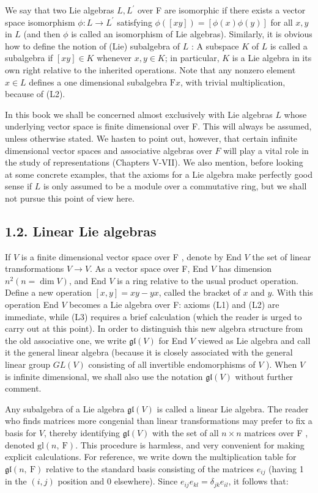 \documentclass[10pt]{article}
\begin{document}
We say that two Lie algebras $L, L^{\prime}$ over F are isomorphic if there exists a vector space isomorphism $\phi: L \rightarrow L^{\prime}$ satisfying $\phi([x y])=[\phi(x) \phi(y)]$ for all $x, y$ in $L$ (and then $\phi$ is called an isomorphism of Lie algebras). Similarly, it is obvious how to define the notion of (Lie) subalgebra of $L$ : A subspace $K$ of $L$ is called a subalgebra if $[x y] \in K$ whenever $x, y \in K$; in particular, $K$ is a Lie algebra in its own right relative to the inherited operations. Note that any nonzero element $x \in L$ defines a one dimensional subalgebra $\mathrm{F} x$, with trivial multiplication, because of (L2).

In this book we shall be concerned almost exclusively with Lie algebras $L$ whose underlying vector space is finite dimensional over F. This will always be assumed, unless otherwise stated. We hasten to point out, however, that certain infinite dimensional vector spaces and associative algebras over $F$ will play a vital role in the study of representations (Chapters V-VII). We also mention, before looking at some concrete examples, that the axioms for a Lie algebra make perfectly good sense if $L$ is only assumed to be a module over a commutative ring, but we shall not pursue this point of view here.

\subsection*{1.2. Linear Lie algebras}
If $V$ is a finite dimensional vector space over F , denote by End $V$ the set of linear transformations $V \rightarrow V$. As a vector space over F, End $V$ has dimension $n^{2}(n=\operatorname{dim} V)$, and End $V$ is a ring relative to the usual product operation. Define a new operation $[x, y]=x y-y x$, called the bracket of $x$ and $y$. With this operation End $V$ becomes a Lie algebra over F: axioms (L1) and (L2) are immediate, while (L3) requires a brief calculation (which the reader is urged to carry out at this point). In order to distinguish this new algebra structure from the old associative one, we write $\mathfrak{g l}(V)$ for End $V$ viewed as Lie algebra and call it the general linear algebra (because it is closely associated with the general linear group $G L(V)$ consisting of all invertible endomorphisms of $V$ ). When $V$ is infinite dimensional, we shall also use the notation $\mathfrak{g l}(V)$ without further comment.

Any subalgebra of a Lie algebra $\mathfrak{g l}(V)$ is called a linear Lie algebra. The reader who finds matrices more congenial than linear transformations may prefer to fix a basis for $V$, thereby identifying $\mathfrak{g l}(V)$ with the set of all $n \times n$ matrices over F , denoted $\mathrm{gl}(n, \mathrm{~F})$. This procedure is harmless, and very convenient for making explicit calculations. For reference, we write down the multiplication table for $\mathfrak{g l}(n, \mathrm{~F})$ relative to the standard basis consisting of the matrices $e_{i j}$ (having 1 in the $(i, j)$ position and 0 elsewhere). Since $e_{i j} e_{k l}=\delta_{j k} e_{i l}$, it follows that:
\end{document}
